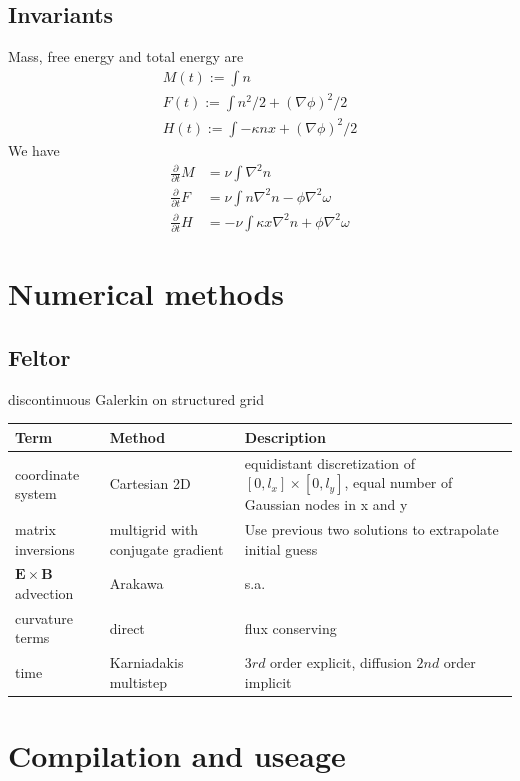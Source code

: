 \documentclass{hitec} %
\newcommand{\ExB}{$\bm{E}\times\bm{B} \,$}
\begin{document}
\subsection{Invariants}
Mass, free energy and total energy are
\begin{align*}
    M(t) := \int n \\
    F(t) := \int n^2/2 + (\nabla\phi)^2/2 \\
    H(t) := \int -\kappa nx + (\nabla\phi)^2/2
    \label{}
\end{align*}
We have
\begin{align}
  \frac{\partial}{\partial t} M &= \nu \int \nabla^2 n \\
  \frac{\partial}{\partial t} F &= \nu\int n\nabla^2 n - \phi\nabla^2\omega \\
  \frac{\partial}{\partial t} H &= - \nu \int \kappa x \nabla^2 n + \phi\nabla^2\omega
  \label{}
\end{align}

\section{Numerical methods}
\subsection{Feltor}
discontinuous Galerkin on structured grid
\begin{longtable}{ll>{\RaggedRight}p{7cm}}
\toprule
\rowcolor{gray!50}\textbf{Term} &  \textbf{Method} & \textbf{Description}  \\ \midrule
coordinate system & Cartesian 2D & equidistant discretization of $[0,l_x] \times [0,l_y]$, equal number of Gaussian nodes in x and y \\
matrix inversions & multigrid with conjugate gradient & Use previous two solutions to extrapolate initial guess \\
\ExB advection & Arakawa & s.a. \cite{Einkemmer2013} \\
curvature terms & direct & flux conserving \\
time &  Karniadakis multistep & $3rd$ order explicit, diffusion $2nd$ order implicit \\
\bottomrule
\end{longtable}

\section{Compilation and useage}
\end{document}
